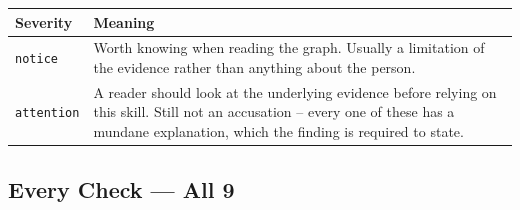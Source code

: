 \documentclass[10pt,a4paper]{article}
\begin{document}
\begin{center}\small
\begin{tabular}{@{}lL{10.6cm}@{}}
\toprule
\textbf{Severity} & \textbf{Meaning} \\
\midrule
\texttt{notice} & Worth knowing when reading the graph. Usually a limitation of the evidence rather than anything about the person. \\
\texttt{attention} & A reader should look at the underlying evidence before relying on this skill. Still not an accusation -- every one of these has a mundane explanation, which the finding is required to state. \\
\bottomrule
\end{tabular}
\end{center}

\subsection{Every Check --- All 9}
\end{document}
